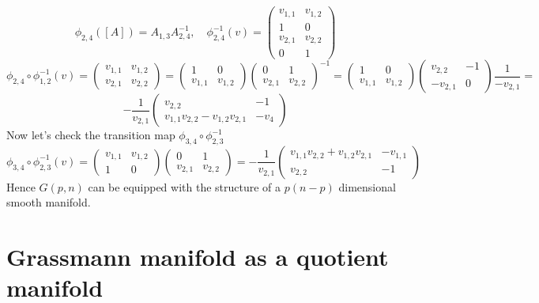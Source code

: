 \documentclass[11pt,a4paper]{report}
\begin{document}
$$ \phi_{2,4}([A]) = A_{1,3} A_{2,4}^{-1}, \quad \phi_{2,4}^{-1}(v) = 
\begin{pmatrix}
v_{1,1} & v_{1,2} \\
1 & 0 \\
v_{2,1} & v_{2,2} \\
0 & 1
\end{pmatrix}
$$
$$ \phi_{2,4} \circ \phi_{1,2}^{-1}(v) = 
\begin{pmatrix}
v_{1,1} & v_{1,2} \\
v_{2,1} & v_{2,2}
\end{pmatrix} =
\begin{pmatrix}
    1 & 0 \\
    v_{1,1} & v_{1,2}
\end{pmatrix}
\begin{pmatrix}
    0 & 1 \\
    v_{2,1} & v_{2,2}
\end{pmatrix} ^{-1}
= 
\begin{pmatrix}
    1 & 0 \\
    v_{1,1} & v_{1,2}
\end{pmatrix}
\begin{pmatrix}
    v_{2,2} & -1 \\
    -v_{2,1} & 0
\end{pmatrix} \frac{1}{-v_{2,1}} = 
$$
$$ -\frac{1}{v_{2,1}} \begin{pmatrix} v_{2,2} & -1 \\ v_{1,1} v_{2,2} - v_{1,2} v_{2,1} & -v_{4} \end{pmatrix}
$$
\newline
Now let's check the transition map $ \phi_{3,4} \circ \phi_{2,3}^{-1} $ 
$$ \phi_{3,4} \circ \phi_{2,3}^{-1} (v) =
\begin{pmatrix} v_{1,1} &  v_{1,2} \\ 1 & 0 \end{pmatrix} 
\begin{pmatrix} 0 & 1 \\ v_{2,1} & v_{2,2} \end{pmatrix} = 
-\frac{1}{v_{2,1}} \begin{pmatrix} v_{1,1} v_{2,2} + v_{1,2} v_{2,1} & -v_{1,1} \\ v_{2,2} & -1 \end{pmatrix}
$$ 
Hence $G(p,n)$ can be equipped with the structure of a $p (n-p) $ dimensional smooth manifold.
\section{Grassmann manifold as a quotient manifold }
\end{document}
